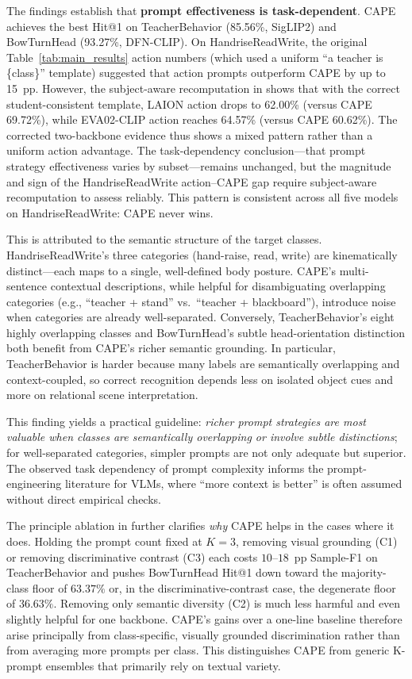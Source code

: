 \documentclass[symmetry,article,submit,pdftex,moreauthors]{Definitions/mdpi}
\begin{document}
The findings establish that \textbf{prompt effectiveness is task-dependent}.
CAPE achieves the best Hit@1 on TeacherBehavior (85.56\%, SigLIP2) and BowTurnHead (93.27\%, DFN-CLIP). On HandriseReadWrite, the original Table~\ref{tab:main_results} action numbers (which used a uniform ``a teacher is \{class\}'' template) suggested that action prompts outperform CAPE by up to 15~pp. However, the subject-aware recomputation in  shows that with the correct student-consistent template, LAION action drops to 62.00\% (versus CAPE 69.72\%), while EVA02-CLIP action reaches 64.57\% (versus CAPE 60.62\%). The corrected two-backbone evidence thus shows a mixed pattern rather than a uniform action advantage. The task-dependency conclusion---that prompt strategy effectiveness varies by subset---remains unchanged, but the magnitude and sign of the HandriseReadWrite action--CAPE gap require subject-aware recomputation to assess reliably.
This pattern is consistent across all five models on HandriseReadWrite: CAPE never wins.

This is attributed to the semantic structure of the target classes.
HandriseReadWrite's three categories (hand-raise, read, write) are kinematically distinct---each maps to a single, well-defined body posture.
CAPE's multi-sentence contextual descriptions, while helpful for disambiguating overlapping categories (e.g., ``teacher + stand'' vs.\ ``teacher + blackboard''), introduce noise when categories are already well-separated.
Conversely, TeacherBehavior's eight highly overlapping classes and BowTurnHead's subtle head-orientation distinction both benefit from CAPE's richer semantic grounding.
In particular, TeacherBehavior is harder because many labels are semantically overlapping and context-coupled, so correct recognition depends less on isolated object cues and more on relational scene interpretation.

This finding yields a practical guideline: \emph{richer prompt strategies are most valuable when classes are semantically overlapping or involve subtle distinctions}; for well-separated categories, simpler prompts are not only adequate but superior.
The observed task dependency of prompt complexity informs the prompt-engineering literature for VLMs, where ``more context is better'' is often assumed without direct empirical checks.

The principle ablation in  further clarifies \emph{why} CAPE helps in the cases where it does. Holding the prompt count fixed at $K=3$, removing visual grounding (\textsc{C1}) or removing discriminative contrast (\textsc{C3}) each costs $10$--$18$~pp Sample-F1 on TeacherBehavior and pushes BowTurnHead Hit@1 down toward the majority-class floor of $63.37\%$ or, in the discriminative-contrast case, the degenerate floor of $36.63\%$. Removing only semantic diversity (\textsc{C2}) is much less harmful and even slightly helpful for one backbone. CAPE's gains over a one-line baseline therefore arise principally from class-specific, visually grounded discrimination rather than from averaging more prompts per class. This distinguishes CAPE from generic K-prompt ensembles that primarily rely on textual variety.
\end{document}
